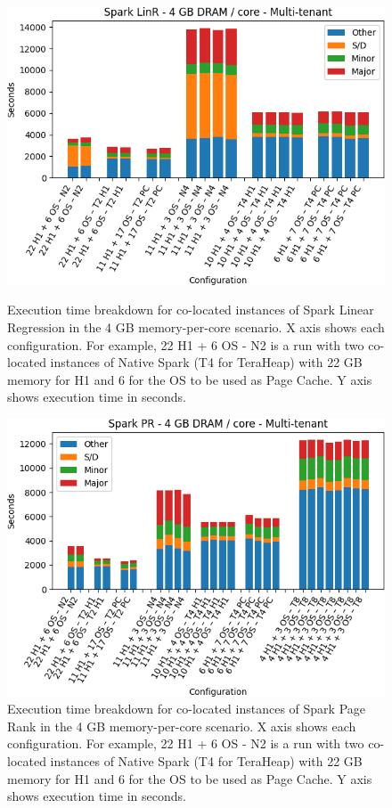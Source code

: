 \begin{figure}[thbp]
\centering
    \includegraphics[width=\linewidth]{./fig/linr64.png}
    \caption{Execution time breakdown for co-located instances of Spark
    Linear Regression in the 4 GB memory-per-core scenario. X axis shows each configuration.
        For example, 22 H1 + 6 OS - N2 is a run with two co-located instances of Native Spark (T4 for TeraHeap) with 22 GB memory for H1 and 6 for the OS to be used as Page Cache. Y axis shows execution time in seconds.}
    \label{fig:linr64}
    \includegraphics[width=\linewidth]{./fig/pr64.png}
    \caption{Execution time breakdown for co-located instances of Spark
    Page Rank in the 4 GB memory-per-core scenario. X axis shows each configuration.
        For example, 22 H1 + 6 OS - N2 is a run with two co-located instances of Native Spark (T4 for TeraHeap) with 22 GB memory for H1 and 6 for the OS to be used as Page Cache. Y axis shows execution time in seconds.}
    \label{fig:pr64}
\end{figure}

